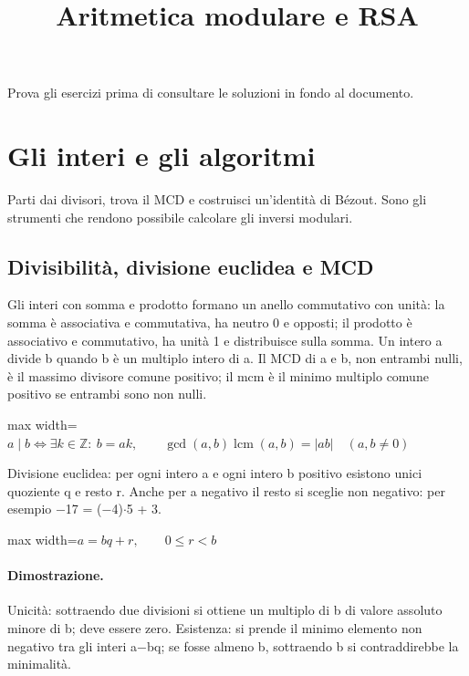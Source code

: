 \documentclass[a4paper,11pt]{article}
\title{Aritmetica modulare e RSA}
\author{}
\date{}
\begin{document}
\maketitle
\tableofcontents
\bigskip
Prova gli esercizi prima di consultare le soluzioni in fondo al documento.


\section{Gli interi e gli algoritmi}

Parti dai divisori, trova il MCD e costruisci un’identità di Bézout. Sono gli strumenti che rendono possibile calcolare gli inversi modulari.

\subsection{Divisibilità, divisione euclidea e MCD}

Gli interi con somma e prodotto formano un anello commutativo con unità: la somma è associativa e commutativa, ha neutro 0 e opposti; il prodotto è associativo e commutativo, ha unità 1 e distribuisce sulla somma. Un intero a divide b quando b è un multiplo intero di a. Il MCD di a e b, non entrambi nulli, è il massimo divisore comune positivo; il mcm è il minimo multiplo comune positivo se entrambi sono non nulli.

\begin{center}\begin{adjustbox}{max width=\linewidth}$\displaystyle a\mid b\iff \exists k\in\mathbb Z:\ b=ak,\qquad \gcd(a,b)\operatorname{lcm}(a,b)=|ab|\quad(a,b\ne0)$\end{adjustbox}\end{center}

Divisione euclidea: per ogni intero a e ogni intero b positivo esistono unici quoziente q e resto r. Anche per a negativo il resto si sceglie non negativo: per esempio $-$17 = ($-$4)$\cdot$5 + 3.

\begin{center}\begin{adjustbox}{max width=\linewidth}$\displaystyle a=bq+r,\qquad 0\le r<b$\end{adjustbox}\end{center}

\paragraph{Dimostrazione.} Unicità: sottraendo due divisioni si ottiene un multiplo di b di valore assoluto minore di b; deve essere zero. Esistenza: si prende il minimo elemento non negativo tra gli interi a$-$bq; se fosse almeno b, sottraendo b si contraddirebbe la minimalità.
\end{document}
